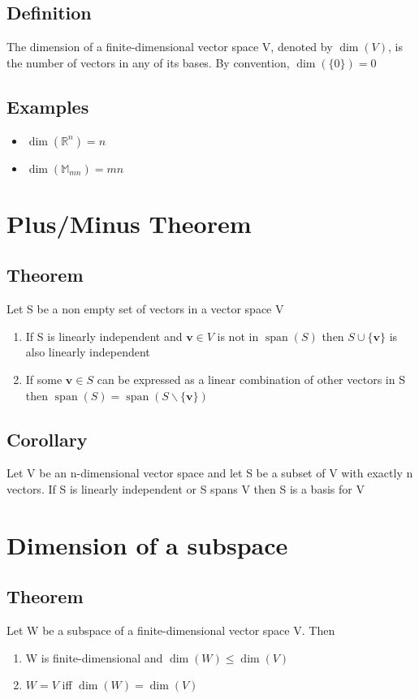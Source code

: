 \documentclass{article}[18pt]
\begin{document}
\subsection{Definition}
The dimension of a finite-dimensional vector space V, denoted by $\operatorname { dim } ( V )$, is the number of vectors in any of its bases. By convention, $\operatorname{dim}(\{0\})=0$
\subsection{Examples}
\begin{itemize}
	\item $\operatorname{dim}(\mathbb{ R }^n)=n$
	\item $\operatorname{dim}(\mathbb{M}_{mn})=mn$
\end{itemize}
\section{Plus/Minus Theorem}
\subsection{Theorem}
Let S be a non empty set of vectors in a vector space V
\begin{enumerate}
	\item If S is linearly independent and $\mathbf{ v }\in V$ is not in $\operatorname{span}(S)$ then $S\cup \{\mathbf{ v }\}$ is also linearly independent
	\item If some $\mathbf{ v }\in S$ can be expressed as a linear combination of other vectors in S then $\operatorname{span}(S)=\operatorname{span}(S\backslash \{\mathbf{ v }\})$
\end{enumerate}
\subsection{Corollary}
Let V be an n-dimensional vector space and let S be a subset of V with exactly n vectors. If S is linearly independent or S spans V then S is a basis for V
\section{Dimension of a subspace}
\subsection{Theorem}
Let W be a subspace of a finite-dimensional vector space V. Then
\begin{enumerate}
	\item W is finite-dimensional and $\operatorname{dim}(W)\leqslant \operatorname{dim}(V)$
	\item $W=V$ iff $\operatorname{dim}(W)=\operatorname{dim}(V)$
\end{enumerate}
\end{document}
